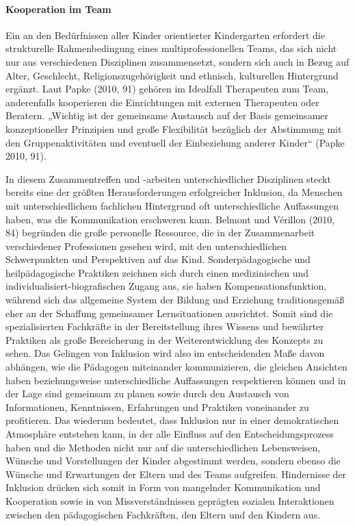 \paragraph{Kooperation im Team}\label{Team}

Ein an den Bedürfnissen aller Kinder orientierter Kindergarten erfordert die strukturelle Rahmenbedingung eines multiprofessionellen Teams, das sich nicht nur aus verschiedenen Disziplinen zusammensetzt, sondern sich auch in Bezug auf Alter, Geschlecht, Religionszugehörigkeit und ethnisch, kulturellen Hintergrund ergänzt.
Laut Papke (2010, 91) gehören im Idealfall Therapeuten zum Team, anderenfalls kooperieren die Einrichtungen mit externen Therapeuten oder Beratern. „Wichtig ist der gemeinsame Austausch auf der Basis gemeinsamer konzeptioneller Prinzipien und große Flexibilität bezüglich der Abstimmung mit den Gruppenaktivitäten und eventuell der Einbeziehung anderer Kinder“ (Papke 2010, 91).

In diesem Zusammentreffen und -arbeiten unterschiedlicher Disziplinen steckt bereits eine der größten Herausforderungen erfolgreicher Inklusion, da Menschen mit unterschiedlichem fachlichen Hintergrund  oft unterschiedliche Auffassungen haben, was die Kommunikation erschweren kann. 
Belmont und Vérillon (2010, 84) begründen die große personelle Ressource, die in der Zusammenarbeit verschiedener Professionen  gesehen wird, mit den unterschiedlichen Schwerpunkten und Perspektiven auf das Kind. Sonderpädagogische und heilpädagogische Praktiken zeichnen sich durch einen medizinischen und individualisiert-biografischen Zugang aus, sie haben Kompensationsfunktion, während sich das allgemeine System der Bildung und Erziehung traditionsgemäß eher an der Schaffung gemeinsamer Lernsituationen ausrichtet. Somit sind die spezialisierten Fachkräfte in der Bereitstellung ihres Wissens und bewährter Praktiken als große Bereicherung in der Weiterentwicklung des Konzepts zu sehen.
Das Gelingen von Inklusion wird also im entscheidenden Maße davon abhängen, wie die Pädagogen miteinander kommunizieren, die gleichen Ansichten haben beziehungsweise unterschiedliche Auffassungen respektieren können und in der Lage sind gemeinsam zu planen sowie durch den Austausch von Informationen, Kenntnissen, Erfahrungen und Praktiken voneinander zu profitieren. Das wiederum bedeutet, dass Inklusion nur in einer demokratischen Atmosphäre entstehen kann, in der alle Einfluss auf den Entscheidungsprozess haben und die Methoden nicht nur auf die unterschiedlichen Lebensweisen, Wünsche und Vorstellungen der Kinder abgestimmt werden, sondern ebenso die Wünsche und Erwartungen der Eltern und des Teams aufgreifen.
Hindernisse der Inklusion drücken sich somit in Form von mangelnder Kommunikation und Kooperation sowie in von Missverständnissen geprägten sozialen Interaktionen zwischen den pädagogischen Fachkräften, den Eltern und den Kindern aus.

